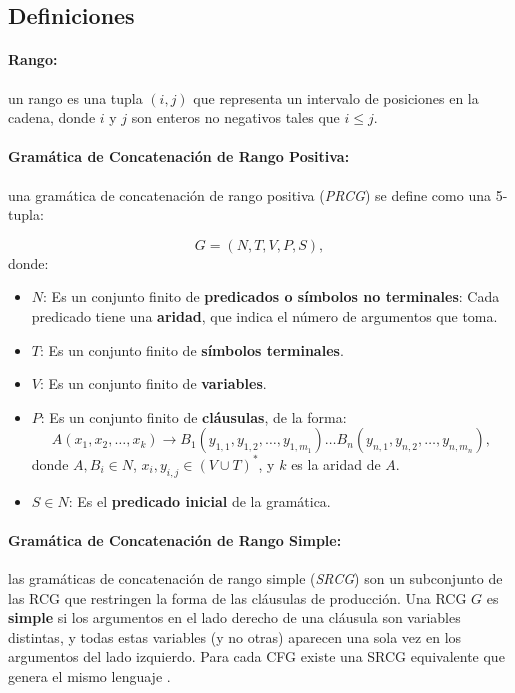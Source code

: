 \documentclass[12pt]{article}
\begin{document}
\subsection{Definiciones}

\paragraph{Rango:} un rango es una tupla $(i, j)$ que representa un intervalo de posiciones en la cadena, donde $i$ y $j$ son enteros no negativos tales que $i \leq j$.

\paragraph{Gramática de Concatenación de Rango Positiva:} una gramática de concatenación de rango positiva (\textit{PRCG}) se define como una 5-tupla:

\[
    G = (N, T, V, P, S),
\]
donde:

\begin{itemize}
    \item $N$: Es un conjunto finito de \textbf{predicados o símbolos no terminales}: Cada predicado tiene una \textbf{aridad}, que indica el número de argumentos que toma.
    \item $T$: Es un conjunto finito de \textbf{símbolos terminales}.
    \item $V$: Es un conjunto finito de \textbf{variables}.
    \item $P$: Es un conjunto finito de \textbf{cláusulas}, de la forma:
          \[
              A(x_1, x_2, \ldots, x_k) \to B_1(y_{1,1}, y_{1,2}, \ldots, y_{1,m_1}) \ldots B_n(y_{n,1}, y_{n,2}, \ldots, y_{n,m_n}),
          \]
          donde $A, B_i \in N$, $x_i, y_{i,j} \in (V \cup T)^*$, y $k$ es la aridad de $A$.
    \item $S \in N$: Es el \textbf{predicado inicial} de la gramática.
\end{itemize}

\paragraph{Gramática de Concatenación de Rango Simple:} las gramáticas de concatenación de rango simple (\textit{SRCG}) son un subconjunto de las RCG que restringen la forma de las cláusulas de producción.
Una RCG $G$ es \textbf{simple} si los argumentos en el lado derecho de una cláusula son variables distintas, y todas estas variables (y no otras) aparecen una sola vez en los argumentos del lado izquierdo.
Para cada CFG existe una SRCG equivalente que genera el mismo lenguaje \cite{mainRCGBib}.
\end{document}
